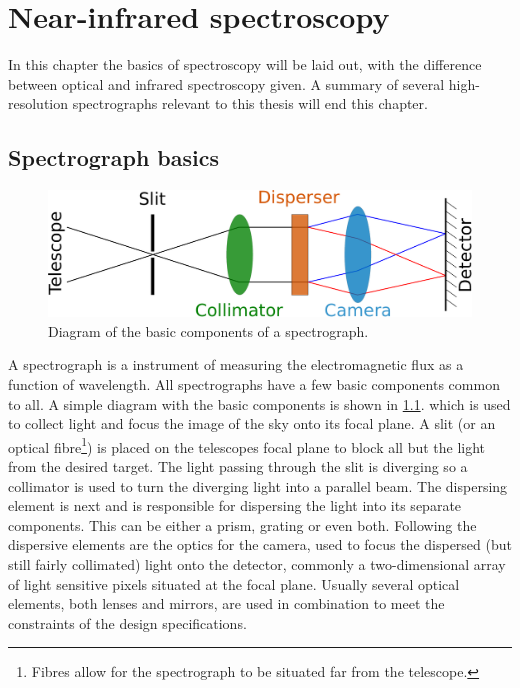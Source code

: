 
\chapter{Near-infrared spectroscopy}
\label{cha:nir_spectroscopy}
In this chapter the basics of spectroscopy will be laid out, with the difference between optical and infrared spectroscopy given.
A summary of several high-resolution \nir{} spectrographs relevant to this thesis will end this chapter.

\section{Spectrograph basics}
\label{sec:spectrosccopy basics}
\begin{figure}
    \centering
    \includegraphics[width=0.7\linewidth]{figures/spectroscopy/spectrograph_elements}
    \caption[Basic components of a spectrograph.]{Diagram of the basic components of a spectrograph.}
    \label{fig:spectrographelements}
\end{figure}
A spectrograph is a instrument of measuring the electromagnetic flux as a function of wavelength.
All spectrographs have a few basic components common to all.
A simple diagram with the basic components is shown in \cref{fig:spectrographelements}.
 which is used to collect light and focus the image of the sky onto its focal plane.
A slit (or an optical fibre\footnote{Fibres allow for the spectrograph to be situated far from the telescope.}) is placed on the telescopes focal plane to block all but the light from the desired target.
The light passing through the slit is diverging so a collimator is used to turn the diverging light into a parallel beam.
The dispersing element is next and is responsible for dispersing the light into its separate components.
This can be either a prism, grating or even both.
Following the dispersive elements are the optics for the camera, used to focus the dispersed (but still fairly collimated) light onto the detector, commonly a two-dimensional array of light sensitive pixels situated at the focal plane.
Usually several optical elements, both lenses and mirrors, are used in combination to meet the constraints of the design specifications.

